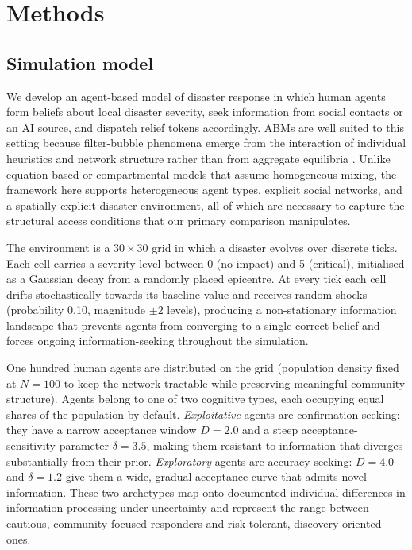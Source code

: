 \documentclass[pdflatex,sn-basic]{sn-jnl}
\begin{document}
\section{Methods}\label{sec:methods}

\subsection{Simulation model}\label{sec:model}

We develop an agent-based model of disaster response in which human agents form beliefs about local disaster severity, seek information from social contacts or an AI source, and dispatch relief tokens accordingly. ABMs are well suited to this setting because filter-bubble phenomena emerge from the interaction of individual heuristics and network structure rather than from aggregate equilibria \citep{epstein2006generative,axelrod1997complexity}.
Unlike equation-based or compartmental models that assume homogeneous mixing, the framework here supports heterogeneous agent types, explicit social networks, and a spatially explicit disaster environment, all of which are necessary to capture the structural access conditions that our primary comparison manipulates.

The environment is a $30 \times 30$ grid in which a disaster evolves over discrete ticks. Each cell carries a severity level between 0 (no impact) and 5 (critical), initialised as a Gaussian decay from a randomly placed epicentre. At every tick each cell drifts stochastically towards its baseline value and receives random shocks (probability 0.10, magnitude $\pm 2$ levels), producing a non-stationary information landscape that prevents agents from converging to a single correct belief and forces ongoing information-seeking throughout the simulation.

One hundred human agents are distributed on the grid (population density fixed at $N = 100$ to keep the network tractable while preserving meaningful community structure). Agents belong to one of two cognitive types, each occupying equal shares of the population by default. \emph{Exploitative} agents are confirmation-seeking: they have a narrow acceptance window $D = 2.0$ and a steep acceptance-sensitivity parameter $\delta = 3.5$, making them resistant to information that diverges substantially from their prior. \emph{Exploratory} agents are accuracy-seeking: $D = 4.0$ and $\delta = 1.2$ give them a wide, gradual acceptance curve that admits novel information. These two archetypes map onto documented individual differences in information processing under uncertainty \citep{hertwig2016homo,march1991exploration}
and represent the range between cautious, community-focused responders and risk-tolerant, discovery-oriented ones.
\end{document}
